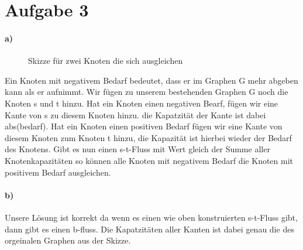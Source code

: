 \documentclass[a4paper]{article}
\begin{document}
\section*{Aufgabe 3}
\paragraph{a)}
\begin{figure}
    \begin{centering}
        \caption{Skizze für zwei Knoten die sich ausgleichen}
    \end{centering}
\end{figure}
Ein Knoten mit negativem Bedarf bedeutet, dass er im Graphen G mehr abgeben kann als er aufnimmt.
Wir fügen zu unserem bestehenden Graphen G noch die Knoten s und t hinzu. Hat ein Knoten einen 
negativen Bearf, fügen wir eine Kante von s zu diesem Knoten hinzu. die Kapatzität der Kante 
ist dabei abs(bedarf). Hat ein Knoten einen positiven Bedarf fügen wir eine Kante von diesem 
Knoten zum Knoten t hinzu, die Kapazität ist hierbei wieder der Bedarf des Knotens. Gibt es 
nun einen s-t-Fluss mit Wert gleich der Summe aller Knotenkapazitäten so können alle Knoten 
mit negativem Bedarf die Knoten mit positivem Bedarf ausgleichen.
\paragraph{b)}
Unsere Lösung ist korrekt da wenn es einen wie oben konstruierten s-t-Fluss gibt, dann 
gibt es einen b-fluss. Die Kapatzitäten aller Kanten ist dabei genau die des orgeinalen Graphen
aus der Skizze.
\end{document}
